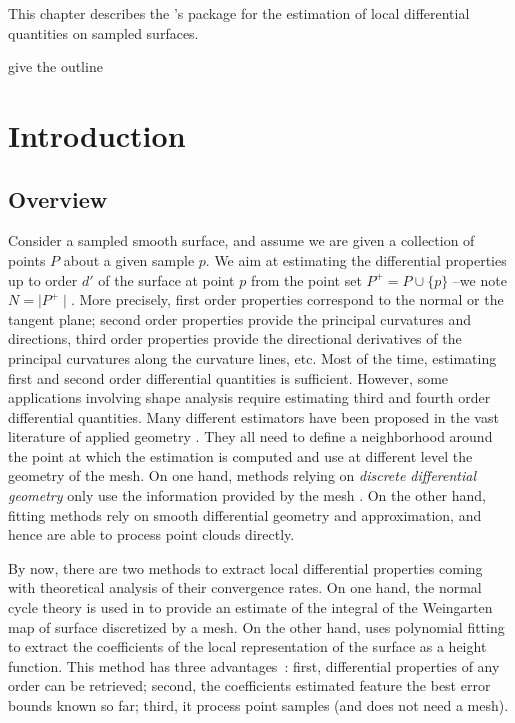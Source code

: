 


This chapter describes the \cgal's package for the estimation of local 
differential quantities on sampled surfaces. 

give the outline
 
\section{Introduction}
\label{sec:intro}

\subsection{Overview}

Consider a sampled smooth surface, and assume we are given a
collection of points $P$ about a given sample $p$. We aim at
estimating the differential properties up to order $d'$ of the surface
at point $p$ from the point set $P^+ = P\cup \{ p\}$ --we note $N=\mid
P^+\mid$. More precisely, first order properties correspond to the
normal or the tangent plane; second order properties provide the
principal curvatures and directions, third order properties provide
the directional derivatives of the principal curvatures along the
curvature lines, etc.  Most of the time, estimating first and second
order differential quantities is sufficient.  However, some
applications involving shape analysis require estimating third and
fourth order differential quantities.
Many different estimators have been proposed in the vast literature of
applied geometry \cite{sp-smrqtm-01}. They all need to define a
neighborhood around the point at which the estimation is computed and
use at different level the geometry of the mesh. On one hand, methods
relying on {\em discrete differential geometry} only use the
information provided by the mesh
\cite{pinkall93a,desbrun00a,dcs-jmm-rdtnc-03}. On the other hand,
fitting methods rely on smooth differential geometry and
approximation, and hence are able to process point clouds directly.

By now, there are two methods to extract local differential properties
coming with theoretical analysis of their convergence rates. On one
hand, the normal cycle theory is used in
\cite{dcs-jmm-rdtnc-03} to provide an estimate of the integral of the
Weingarten map of surface discretized by a mesh.  On the other hand,
\cite{fc-mp-edqpfoj-05} uses polynomial fitting to extract the
coefficients of the local representation of the surface as a height
function. This method has three advantages~: first, differential
properties of any order can be retrieved; second, the coefficients
estimated feature the best error bounds known so far; third, it
process point samples (and does not need a mesh).



